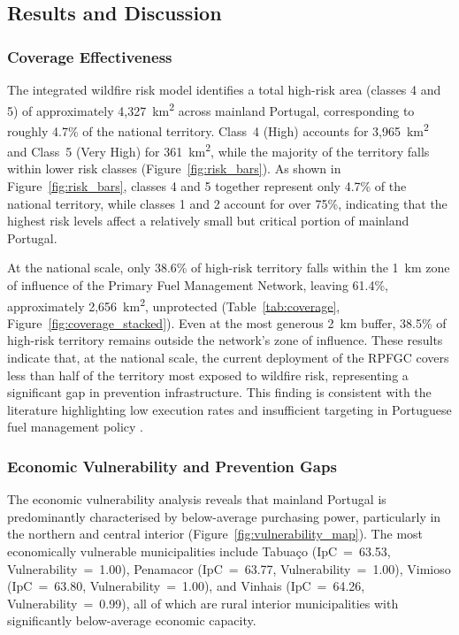 \subsection{Results and Discussion}
\label{subsec:results}


\subsubsection*{Coverage Effectiveness}

The integrated wildfire risk model identifies a total high-risk area
(classes 4 and 5) of approximately 4,327~km\textsuperscript{2} across
mainland Portugal, corresponding to roughly 4.7\% of the national
territory. Class~4 (High) accounts for 3,965~km\textsuperscript{2}
and Class~5 (Very High) for 361~km\textsuperscript{2}, while the
majority of the territory falls within lower risk classes
(Figure~\ref{fig:risk_bars}). As shown in Figure~\ref{fig:risk_bars},
classes 4 and 5 together represent only 4.7\% of the national
territory, while classes 1 and 2 account for over 75\%, indicating
that the highest risk levels affect a relatively small but critical
portion of mainland Portugal.

At the national scale, only 38.6\% of high-risk territory falls
within the 1~km zone of influence of the Primary Fuel Management
Network, leaving 61.4\%,  approximately
2,656~km\textsuperscript{2}, unprotected
(Table~\ref{tab:coverage}, Figure~\ref{fig:coverage_stacked}).
Even at the most generous 2~km buffer, 38.5\% of high-risk
territory remains outside the network's zone of influence. These
results indicate that, at the national scale, the current deployment
of the RPFGC covers less than half of the territory most exposed to
wildfire risk, representing a significant gap in prevention
infrastructure. This finding is consistent with the literature
highlighting low execution rates and insufficient targeting in
Portuguese fuel management policy \cite{FrontiersPortugal2023}.

\subsubsection*{Economic Vulnerability and Prevention Gaps}

The economic vulnerability analysis reveals that mainland Portugal
is predominantly characterised by below-average purchasing power,
particularly in the northern and central interior
(Figure~\ref{fig:vulnerability_map}). The most economically
vulnerable municipalities include Tabuaço (IpC~=~63.53,
Vulnerability~=~1.00), Penamacor (IpC~=~63.77,
Vulnerability~=~1.00), Vimioso (IpC~=~63.80,
Vulnerability~=~1.00), and Vinhais (IpC~=~64.26,
Vulnerability~=~0.99), all of which are rural interior
municipalities with significantly below-average economic capacity.

